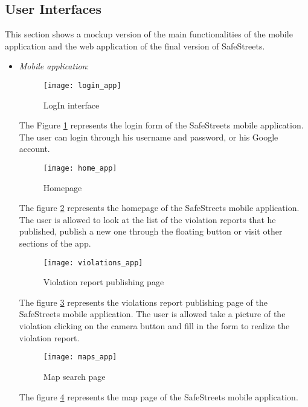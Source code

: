 \subsection{User Interfaces}
This section shows a mockup version of the main functionalities of the mobile application and the web application of the final version of SafeStreets.
\begin{itemize}
    \item \textit{Mobile application}:
            \begin{figure}[H]
                \centering
                \texttt{[image: login\_app]}
                \caption{LogIn interface}
                \label{fig:login_app}
            \end{figure}
            The Figure \ref{fig:login_app} represents the login form of the SafeStreets
            mobile application. The user can login through his username
            and password, or his Google account.
            \begin{figure}[H]
                \centering
                \texttt{[image: home\_app]}
                \caption{Homepage}
                \label{fig:home_app}
            \end{figure}
            The figure \ref{fig:home_app} represents the homepage of the SafeStreets
            mobile application. The user is allowed to look at the list
            of the violation reports that he published, publish a new one
            through the floating button or visit other sections of the app.
            \begin{figure}[H]
                \centering
                \texttt{[image: violations\_app]}
                \caption{Violation report publishing page}
                \label{fig:violations_app}
            \end{figure}
            The figure \ref{fig:violations_app} represents the violations report
            publishing page of the SafeStreets mobile application. 
            The user is allowed take a picture of the violation clicking on the camera
            button and fill in the form to realize the violation report.
            \begin{figure}[H]
                \centering
                \texttt{[image: maps\_app]}
                \caption{Map search page}
                \label{fig:maps_app}
            \end{figure}
            The figure \ref{fig:maps_app} represents the map page of the SafeStreets mobile application. 

\end{itemize}
